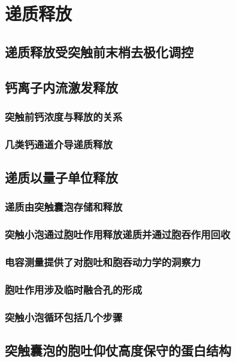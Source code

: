\chapter{递质释放}

\section{递质释放受突触前末梢去极化调控}

\section{钙离子内流激发释放}
\subsection{突触前钙浓度与释放的关系}
\subsection{几类钙通道介导递质释放}

\section{递质以量子单位释放}
\subsection{递质由突触囊泡存储和释放}
\subsection{突触小泡通过胞吐作用释放递质并通过胞吞作用回收}
\subsection{电容测量提供了对胞吐和胞吞动力学的洞察力}
\subsection{胞吐作用涉及临时融合孔的形成}
\subsection{突触小泡循环包括几个步骤}

\section{突触囊泡的胞吐仰仗高度保守的蛋白结构}
